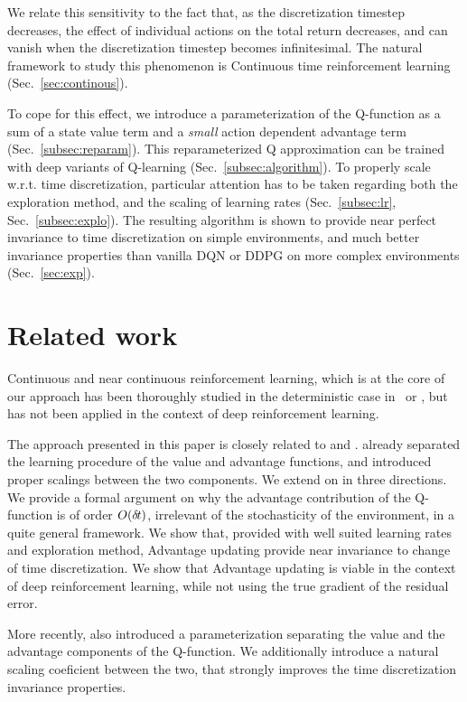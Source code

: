 \documentclass{article}
\begin{document}
We relate this sensitivity to the fact that, as the discretization timestep
decreases, the effect of individual actions on the total return decreases, and
can vanish when the discretization timestep becomes infinitesimal. The natural
framework to study this phenomenon is Continuous time reinforcement learning 
(Sec.~\ref{sec:continous}). 

To cope for this effect, we introduce a
parameterization of the Q-function as a sum of a state value term and a
\emph{small} action dependent advantage term (Sec.~\ref{subsec:reparam}). This
reparameterized Q approximation can be trained with deep variants of Q-learning
(Sec.~\ref{subsec:algorithm}).  To properly scale w.r.t. time discretization,
particular attention has to be taken regarding both the exploration method, and
the scaling of learning rates (Sec.~\ref{subsec:lr}, Sec.~\ref{subsec:explo}).
The resulting algorithm is shown to provide near perfect invariance to time
discretization on simple environments, and much better invariance properties
than vanilla DQN or DDPG on more complex environments (Sec.~\ref{sec:exp}).

\section{Related work}
\label{sec:related}
Continuous and near continuous reinforcement learning, which is at the core of
our approach has been thoroughly studied in the deterministic case
in~\cite{adv_upd} or \cite{cont_rl}, but has not been applied in the context of
deep reinforcement learning.

The approach presented in this paper is closely related to \cite{adv_upd} and
\cite{cont_rl}. \cite{adv_upd} already separated the learning procedure of the
value and advantage functions, and introduced proper scalings between the two
components. We extend on \cite{adv_upd} in three directions. We provide a
formal argument on why the advantage contribution of the Q-function is of order
$O(\delta\hspace{-.1em}t)$, irrelevant of the stochasticity of the environment, in a quite
general framework. We show that, provided with well suited learning rates and
exploration method, Advantage updating provide near invariance to change of time
discretization. We show that Advantage updating is viable in the context of deep
reinforcement learning, while not using the true gradient of the residual error.

More recently, \cite{dueling_nets} also introduced a parameterization separating
the value and the advantage components of the Q-function. We additionally
introduce a natural scaling coeficient between the two, that strongly improves
the time discretization invariance properties.
\end{document}
